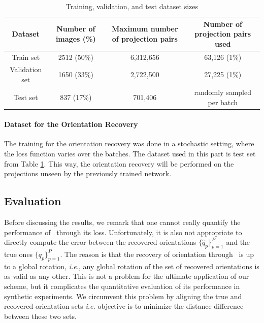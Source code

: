 \begin{table}[h!]
\centering
\begin{tabular}{||c | c c c||} 
 \hline
 Dataset & Number of images (\%) & Maximum number of projection pairs & Number of projection pairs used\\ [0.5ex] 
 \hline\hline
Train set & 2512 (50\%) & 6,312,656 & 63,126 (1\%)\\ 
Validation set & 1650 (33\%) & 2,722,500 & 27,225 (1\%)\\ 
Test set & 837 (17\%) & 701,406 & randomly sampled per batch \\ [1ex] 
 \hline
\end{tabular}
\caption{Training, validation, and test dataset sizes}
\label{table:dataset}
\end{table}


\paragraph{Dataset for the Orientation Recovery}
The training for the orientation recovery was done in a stochastic setting, where the loss function varies over the batches.
The dataset used in this part is test set from Table \ref{table:dataset}. This way, the orientation recovery will be performed on the projections unseen by the previously trained network.


\subsection{Evaluation}\label{sec:results:evaluation}



Before discussing the results, we remark that one cannot really quantify the performance of~ through its loss.
Unfortunately, it is also not appropriate to directly compute the error between the recovered orientations $\big\{\widehat{q}_p\big\}_{p=1}^P$ and the true ones $\big\{q_p\big\}_{p=1}^P$.
The reason is that the recovery of orientation through~ is up to a global rotation, \textit{i.e.}, any global rotation of the set of recovered orientations is as valid as any other.
This is not a problem for the ultimate application of our scheme, but it complicates the quantitative evaluation of its performance in synthetic experiments.
We circumvent this problem by aligning the true and recovered orientation sets \textit{i.e.} objective is to minimize the distance difference between these two sets.

